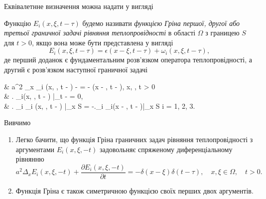 Еквівалетнне визначення можна надати у вигляді
\begin{definition}
	Функцію $E_i (x, \xi, t - \tau)$ будемо називати \textit{функцією Гріна першої, другої або третьої граничної задачі рівняння теплопровідності} в області $\Omega$ з границею $S$ для $t > 0$, якщо вона може бути представлена у вигляді
	\begin{equation}
		E_i(x, \xi, t - \tau) = \epsilon(x - \xi, t - \tau) + \omega_i(x, \xi, t - \tau),
	\end{equation}
	де  перший доданок є фундаментальним розв'язком оператора теплопровідності, а другий  є розв'язком наступної граничної задачі
	\begin{system}
		& a^2 \Delta_x \omega_i (x, \xi, t - \tau) -  = - \delta(x - \xi, t - \tau), \quad x, \xi \in \Omega, \quad t > 0 \\
		& \left. \omega_i(x, \xi, t - \tau) \right|_{t - \tau {}} = 0, \\
		& \left. \ell_i \omega_i (x, \xi, t - \tau) \right|_{x \in S} = -\left.\ell_i \epsilon_i(x - \xi, t - \tau)\right|_{x \in S} \quad i = 1, 2, 3.
	\end{system}
\end{definition}

Вивчимо 
\begin{properties}
	\begin{enumerate}
		\item Легко бачити, що функція Гріна граничних задач рівняння теплопровідності з аргументами $E_i(x, \xi, -t)$ задовольняє спряженому диференціальному рівнянню
		\begin{equation}
			a^2 \Delta_x E_i(x, \xi, -t) + \frac{\partial E_i(x, \xi, - t)}{\partial t} = - \delta(x - \xi) \delta (t - \tau), \quad x, \xi \in \Omega, \quad t > 0.
		\end{equation}
		\item Функція Гріна є також симетричною функцією своїх перших двох аргументів.
	\end{enumerate}
\end{properties}
	

